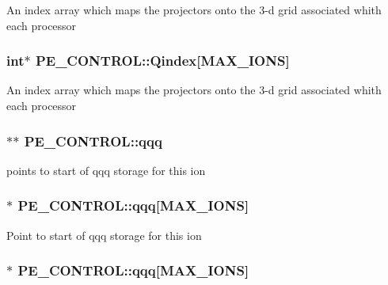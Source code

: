 An index array which maps the projectors onto the 3-\/d grid associated whith each processor \hypertarget{struct_p_e___c_o_n_t_r_o_l_a6b3b9245e4f4bd3743405596a6ea0b62}{
\subsubsection[{Qindex}]{\setlength{\rightskip}{0pt plus 5cm}int$\ast$ P\-E\-\_\-\-C\-O\-N\-T\-R\-O\-L\-::\-Qindex\mbox{[}{\bf M\-A\-X\-\_\-\-I\-O\-N\-S}\mbox{]}}}\label{struct_p_e___c_o_n_t_r_o_l_a6b3b9245e4f4bd3743405596a6ea0b62}
An index array which maps the projectors onto the 3-\/d grid associated whith each processor \hypertarget{struct_p_e___c_o_n_t_r_o_l_a8fac4a5e0bf8e40998ed33fcd1fc5e6b}{
\subsubsection[{qqq}]{$\ast$$\ast$ P\-E\-\_\-\-C\-O\-N\-T\-R\-O\-L\-::qqq}}\label{struct_p_e___c_o_n_t_r_o_l_a8fac4a5e0bf8e40998ed33fcd1fc5e6b}
points to start of qqq storage for this ion \hypertarget{struct_p_e___c_o_n_t_r_o_l_a2055f47411c0e8a191fec0b348812853}{
\subsubsection[{qqq}]{$\ast$ P\-E\-\_\-\-C\-O\-N\-T\-R\-O\-L\-::qqq\mbox{[}{\bf M\-A\-X\-\_\-\-I\-O\-N\-S}\mbox{]}}}\label{struct_p_e___c_o_n_t_r_o_l_a2055f47411c0e8a191fec0b348812853}
Point to start of qqq storage for this ion \hypertarget{struct_p_e___c_o_n_t_r_o_l_a993f6909d351849a8f10a087649cd299}{
\subsubsection[{qqq}]{$\ast$ P\-E\-\_\-\-C\-O\-N\-T\-R\-O\-L\-::qqq\mbox{[}{\bf M\-A\-X\-\_\-\-I\-O\-N\-S}\mbox{]}}}\label{struct_p_e___c_o_n_t_r_o_l_a993f6909d351849a8f10a087649cd299}
